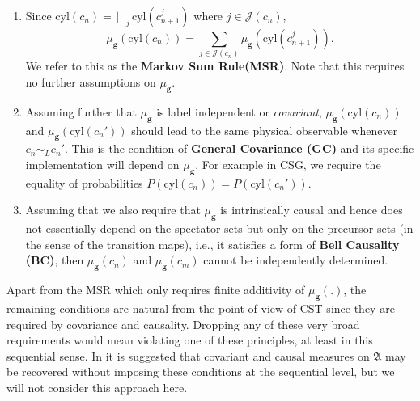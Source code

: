 \documentclass[11pt]{article}
\newcommand{\cyl}[1]{{\mathrm{cyl}({#1})}}
\newcommand{\fA}{\mathfrak A}
\newcommand{\cJ}{\mathcal J}
\newcommand{\gmu}{\mu_{\mathbf{g}}}
\begin{document}
\begin{enumerate}  
\item  Since $\cyl{c_n}= \bigsqcup_j
  \cyl{c_{n+1}^j}$ where $j \in \cJ(c_n)$,
  \begin{equation} \gmu(\cyl{c_n})=\sum_{j
      \in \cJ(c_n)} \gmu(\cyl{c_{n+1}^j}). \label{gmumsr.eq}
  \end{equation}   We refer to this as the
  \textbf{Markov Sum Rule(MSR)}. Note that this requires no further
  assumptions on $\gmu$.  

\item  Assuming further that   $\gmu$ is label
  independent or {\sl  covariant},  $\gmu(\cyl{c_n})$ and $\gmu(\cyl{c_n'})$
  should lead to the same physical observable whenever $c_n \sim_L c_n'$.   This is the condition of
\textbf{General Covariance (GC)}  and its specific implementation will
depend on $\gmu$. For example in CSG, we require  the equality of 
probabilities $P(\cyl{c_n})=P(\cyl{c_n'})$.  

\item Assuming that we also require that $\gmu$ is intrinsically
  causal and hence does not essentially
  depend on the spectator sets but only on the precursor sets (in the
  sense of the transition maps), i.e., it satisfies a form of
  \textbf{Bell Causality (BC)},  then $\gmu(c_n)$ and $\gmu(c_m)$ cannot be independently
  determined. 
\end{enumerate} 
  

Apart from the MSR which only requires finite additivity of $\gmu(.)$,
the remaining conditions are natural from the point of view of CST
since they are required by covariance and causality. Dropping any of
these very broad requirements would mean violating one of these
principles, at least in this sequential sense. In \cite{bm} it is
suggested that covariant and causal measures on $\fA$  may be
recovered without imposing these conditions at the sequential
level, but we will not consider this approach here. 
\end{document}

